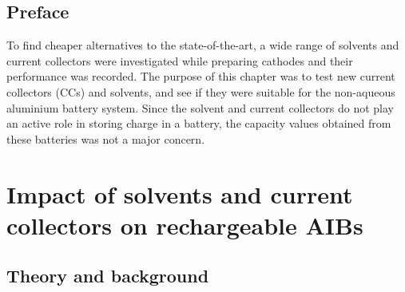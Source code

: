 \section*{Preface}
To find cheaper alternatives to the state-of-the-art, a wide range of solvents and current collectors were investigated while preparing cathodes and their performance was recorded. The purpose of this chapter was to test new current collectors (CCs) and solvents, and see if they were suitable for the non-aqueous aluminium battery system. Since the solvent and current collectors do not play an active role in storing charge in a battery, the capacity values obtained from these batteries was not a major concern. 
\newpage

\chapter{Impact of solvents and current collectors on rechargeable AIBs} %
\label{chap7} %

\section{Theory and background}

